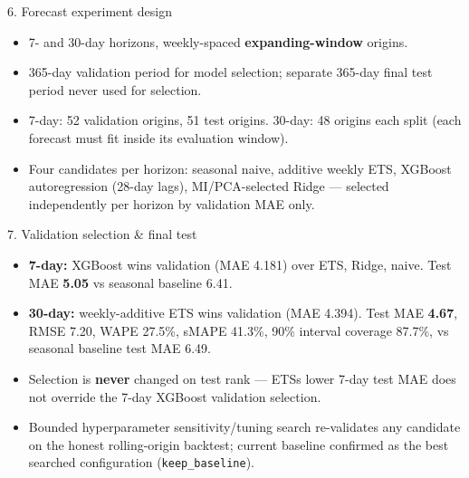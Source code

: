\documentclass[
  ignorenonframetext,
]{beamer}
\providecommand{\tightlist}{%
  \setlength{\itemsep}{0pt}\setlength{\parskip}{0pt}}
\begin{document}
\begin{frame}
\begin{block}{6. Forecast experiment design}
\protect{}\label{6-forecast-experiment-design}
\begin{itemize}
\tightlist
\item
  7- and 30-day horizons, weekly-spaced \textbf{expanding-window}
  origins.
\item
  365-day validation period for model selection; separate 365-day final
  test period never used for selection.
\item
  7-day: 52 validation origins, 51 test origins. 30-day: 48 origins each
  split (each forecast must fit inside its evaluation window).
\item
  Four candidates per horizon: seasonal naive, additive weekly ETS,
  XGBoost autoregression (28-day lags), MI/PCA-selected Ridge ---
  selected independently per horizon by validation MAE only.
\end{itemize}
\end{block}
\end{frame}

\begin{frame}[fragile]
\begin{block}{7. Validation selection \& final test}
\protect{}\label{7-validation-selection--final-test}
\begin{itemize}
\tightlist
\item
  \textbf{7-day:} XGBoost wins validation (MAE 4.181) over ETS, Ridge,
  naive. Test MAE \textbf{5.05} vs seasonal baseline 6.41.
\item
  \textbf{30-day:} weekly-additive ETS wins validation (MAE 4.394). Test
  MAE \textbf{4.67}, RMSE 7.20, WAPE 27.5\%, sMAPE 41.3\%, 90\% interval
  coverage 87.7\%, vs seasonal baseline test MAE 6.49.
\item
  Selection is \textbf{never} changed on test rank ---
  ETS\textquotesingle s lower 7-day test MAE does not override the 7-day
  XGBoost validation selection.
\item
  Bounded hyperparameter sensitivity/tuning search re-validates any
  candidate on the honest rolling-origin backtest; current baseline
  confirmed as the best searched configuration
  (\texttt{keep\_baseline}).
\end{itemize}
\end{block}
\end{frame}
\end{document}
